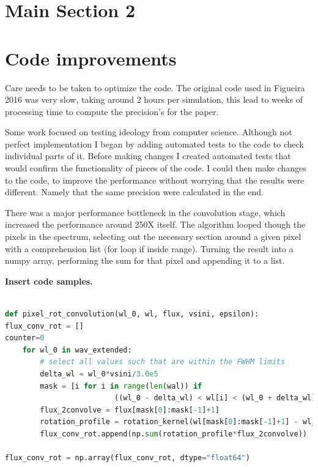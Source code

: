 \section{Main Section 2}



\section{Code improvements}
Care needs to be taken to optimize the code. The original code used in Figueira 2016 was very slow, taking around 2 hours per simulation, this lead to weeks of processing time to compute the precision's for the paper.

Some work focused on testing ideology from computer science. Although not perfect implementation I began by adding automated tests to the code to check individual parts of it. 
Before making changes I created automated tests that would confirm the functionality of pieces of the code. I could then make changes to the code, to improve the performance without worrying that the results were different.
Namely that the same precision were calculated in the end.

There was a major performance bottleneck in the convolution stage, which increased the performance around 250X itself. The algorithm looped though the pixels in the spectrum, selecting out the necessary section around a given pixel with a comprehension list (for loop if inside range). Turning the result into a numpy array, performing the sum for that pixel and appending it to a list. 

\textbf{Insert code samples.}

\begin{lstlisting}[language=Python, caption=Python example old]

def pixel_rot_convolution(wl_0, wl, flux, vsini, epsilon):
flux_conv_rot = []
counter=0
    for wl_0 in wav_extended:
        # select all values such that are within the FWHM limits
        delta_wl = wl_0*vsini/3.0e5
        mask = [i for i in range(len(wal)) if
                         ((wl_0 - delta_wl) < wl[i] < (wl_0 + delta_wl))]
        flux_2convolve = flux[mask[0]:mask[-1]+1]
        rotation_profile = rotation_kernel(wl[mask[0]:mask[-1]+1] - wl_0, delta_wl, vsini, epsilon)
        flux_conv_rot.append(np.sum(rotation_profile*flux_2convolve))
 
flux_conv_rot = np.array(flux_conv_rot, dtype="float64")

\end{lstlisting}

